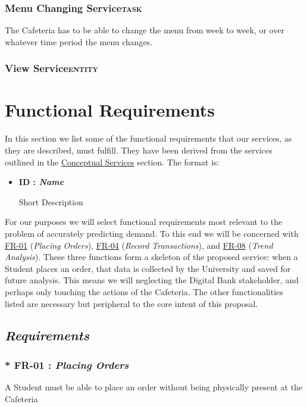 \documentclass[11pt]{article}
\begin{document}
\subsubsection*{Menu Changing Service\hfill{}\textsc{task}}
\label{sec:orga2faec8}
The Cafeteria has to be able to change the menu from week to week,
or over whatever time period the menu changes.

\subsubsection*{View Service\hfill{}\textsc{entity}}
\label{sec:org77a5eb1}
\section{Functional Requirements}
\label{sec:orge910821}

In this section we list some of the functional requirements that our
services, as they are described, must fulfill. They have been
derived from the services outlined in the \hyperref[sec:orga7dd9da]{Conceptual Services}
section. The format is:

\begin{itemize}
\item \textbf{ID : \emph{Name}}

Short Description
\end{itemize}

For our purposes we will select functional requirements most
relevant to the problem of accurately predicting demand. To this end
we will be concerned with \hyperref[org4aaa238]{FR-01} (\emph{Placing Orders}), \hyperref[orgec11eaa]{FR-04} (\emph{Record
Transactions}), and \hyperref[org739ed85]{FR-08} (\emph{Trend Analysis}). These three functions
form a skeleton of the proposed service: when a Student places an
order, that data is collected by the University and saved for future
analysis. This means we will neglecting the Digital Bank
stakeholder, and perhaps only touching the actions of the
Cafeteria. The other functionalities listed are necessary but
peripheral to the core intent of this proposal.

\newpage
\subsection*{\emph{Requirements}}
\label{sec:org2cffa5b}
\subsubsection*{* \label{org4aaa238}FR-01 : \emph{Placing Orders}}
\label{sec:org2c712c3}
A Student must be able to place an order without being physically
present at the Cafeteria
\end{document}
